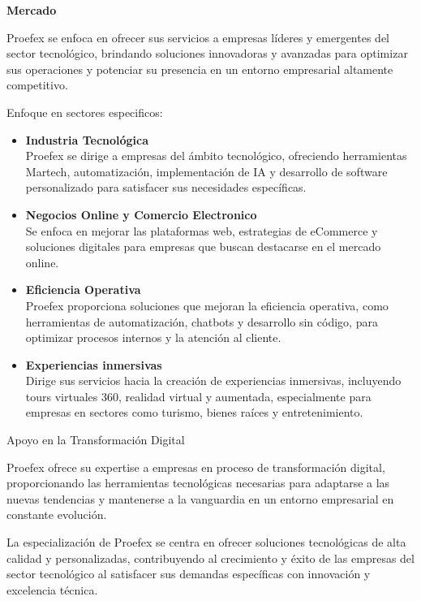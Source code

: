 \textbf{Mercado}

Proefex se enfoca en ofrecer sus servicios a empresas líderes y emergentes del sector tecnológico,
		brindando soluciones innovadoras y avanzadas para optimizar sus operaciones y potenciar su
		presencia en un entorno empresarial altamente competitivo.

Enfoque en sectores especificos:

\begin{itemize}
    \item \textbf{Industria Tecnológica}\\ 
	Proefex se dirige a empresas del ámbito tecnológico, ofreciendo herramientas Martech,
	automatización, implementación de IA y desarrollo de software personalizado para satisfacer
	sus necesidades específicas.

    \item \textbf{Negocios Online y Comercio Electronico}\\
	Se enfoca en mejorar las plataformas web, estrategias de eCommerce y soluciones digitales 
	para empresas que buscan destacarse en el mercado online.

    \item \textbf{Eficiencia Operativa}\\
	Proefex proporciona soluciones que mejoran la eficiencia operativa, como herramientas de
	automatización, chatbots y desarrollo sin código, para optimizar procesos internos y la 
	atención al cliente.

    \item \textbf{Experiencias inmersivas}\\
		Dirige sus servicios hacia la creación de experiencias inmersivas, incluyendo tours
		virtuales 360, realidad virtual y aumentada, especialmente para empresas en sectores
		como turismo, bienes raíces y entretenimiento.
\end{itemize}

Apoyo en la Transformación Digital

Proefex ofrece su expertise a empresas en proceso de transformación digital, proporcionando las
herramientas tecnológicas necesarias para adaptarse a las nuevas tendencias y mantenerse a la 
vanguardia en un entorno empresarial en constante evolución.

La especialización de Proefex se centra en ofrecer soluciones tecnológicas de alta calidad
y personalizadas, contribuyendo al crecimiento y éxito de las empresas del sector tecnológico
al satisfacer sus demandas específicas con innovación y excelencia técnica.

